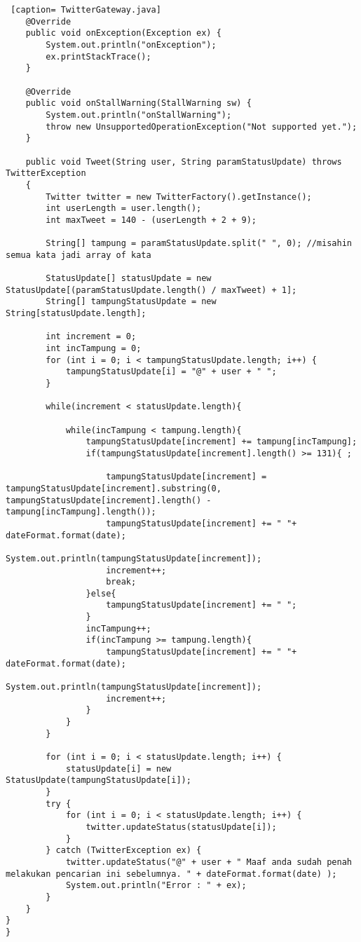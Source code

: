 \begin{lstlisting} [caption= TwitterGateway.java]
    @Override
    public void onException(Exception ex) {
        System.out.println("onException");
        ex.printStackTrace();
    }

    @Override
    public void onStallWarning(StallWarning sw) {
        System.out.println("onStallWarning");
        throw new UnsupportedOperationException("Not supported yet.");
    }
    
    public void Tweet(String user, String paramStatusUpdate) throws TwitterException
    {
        Twitter twitter = new TwitterFactory().getInstance();
        int userLength = user.length();
        int maxTweet = 140 - (userLength + 2 + 9);
        
        String[] tampung = paramStatusUpdate.split(" ", 0); //misahin semua kata jadi array of kata
        
        StatusUpdate[] statusUpdate = new StatusUpdate[(paramStatusUpdate.length() / maxTweet) + 1];
        String[] tampungStatusUpdate = new String[statusUpdate.length];
        
        int increment = 0;
        int incTampung = 0;
        for (int i = 0; i < tampungStatusUpdate.length; i++) {
            tampungStatusUpdate[i] = "@" + user + " ";
        }
        
        while(increment < statusUpdate.length){
            
            while(incTampung < tampung.length){
                tampungStatusUpdate[increment] += tampung[incTampung]; 
                if(tampungStatusUpdate[increment].length() >= 131){ ;
                    
                    tampungStatusUpdate[increment] = tampungStatusUpdate[increment].substring(0, tampungStatusUpdate[increment].length() - tampung[incTampung].length());
                    tampungStatusUpdate[increment] += " "+ dateFormat.format(date);
                    System.out.println(tampungStatusUpdate[increment]);
                    increment++;
                    break;
                }else{
                    tampungStatusUpdate[increment] += " ";
                }
                incTampung++;
                if(incTampung >= tampung.length){
                    tampungStatusUpdate[increment] += " "+ dateFormat.format(date);
                    System.out.println(tampungStatusUpdate[increment]);
                    increment++;
                }
            }
        }
        
        for (int i = 0; i < statusUpdate.length; i++) {
            statusUpdate[i] = new StatusUpdate(tampungStatusUpdate[i]);
        }
        try {
            for (int i = 0; i < statusUpdate.length; i++) {
                twitter.updateStatus(statusUpdate[i]);
            }
        } catch (TwitterException ex) {
            twitter.updateStatus("@" + user + " Maaf anda sudah penah melakukan pencarian ini sebelumnya. " + dateFormat.format(date) );
            System.out.println("Error : " + ex);
        }
    }
}
}
\end{lstlisting}